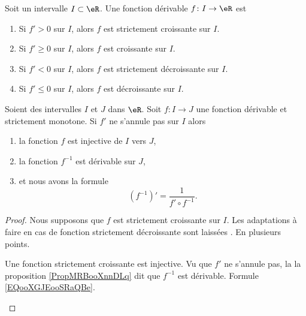 \begin{proposition}      \label{PROPooKZPZooWjIsWg}
	Soit un intervalle \( I\subset \eR\).  Une fonction dérivable \( f\colon I\to \eR\) est
	\begin{enumerate}
		\item
		      Si \( f'>0\) sur \( I\), alors \( f\) est strictement croissante sur \( I\).
		\item
		      Si \( f'\geq 0\) sur \( I\), alors \( f\) est croissante sur \( I\).
		\item
		      Si \( f'<0\) sur \( I\), alors \( f\) est strictement décroissante sur \( I\).
		\item
		      Si \( f'\leq 0\) sur \( I\), alors \( f\) est décroissante sur \( I\).
	\end{enumerate}
\end{proposition}

\begin{proposition}      \label{PROPooSGTBooFxUuXK}
	Soient des intervalles \( I\) et \( J\) dans \( \eR\).  Soit \(f \colon I\to J \) une fonction dérivable et strictement monotone. Si \( f'\)  ne s'annule pas sur \( I\) alors
	\begin{enumerate}
		\item       \label{ITEMooFXHYooRNHYPI}
		      la fonction \( f\) est injective de \( I\) vers \( J\),
		\item       \label{ITEMooWPPIooDUAYsH}
		      la fonction \( f^{-1}\) est dérivable sur \( J\),
		\item       \label{ITEMooTVMLooQgjLEB}
		      et nous avons la formule
		      \begin{equation}        \label{EQooELIHooDxUFxH}
			      (f^{-1})'=\frac{1}{ f'\circ f^{-1} }.
		      \end{equation}
	\end{enumerate}
\end{proposition}

\begin{proof}
	Nous supposons que \( f\) est strictement croissante sur \( I\). Les adaptations à faire en cas de fonction strictement décroissante sont laissées . En plusieurs points.
	\begin{subproof}
		Une fonction strictement croissante est injective.
		Vu que \( f'\) ne s'annule pas, la la proposition \ref{PropMRBooXnnDLq} dit que \( f^{-1}\) est dérivable.
		Formule \ref{EQooXGJEooSRaQBe}.
	\end{subproof}
\end{proof}

